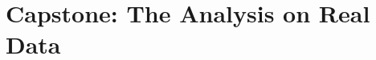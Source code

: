 \chapter{Capstone: The Analysis on Real Data}\label{ch:13}
\providecommand{\TwelveAHoleMaxFull}{}\renewcommand{\TwelveAHoleMaxFull}{7899}
\providecommand{\TwelveAKeptMaxFull}{}\renewcommand{\TwelveAKeptMaxFull}{501}
\providecommand{\TwelveAHoleMaxHmOne}{}\renewcommand{\TwelveAHoleMaxHmOne}{9952}
\providecommand{\TwelveAKeptMaxHmOne}{}\renewcommand{\TwelveAKeptMaxHmOne}{521}
\providecommand{\TwelveAHoleMaxHmTwo}{}\renewcommand{\TwelveAHoleMaxHmTwo}{5906}
\providecommand{\TwelveAKeptMaxHmTwo}{}\renewcommand{\TwelveAKeptMaxHmTwo}{513}
\providecommand{\TwelveABeamVsGauss}{}\renewcommand{\TwelveABeamVsGauss}{0.07}
\providecommand{\TwelveAFskyMaskFull}{}\renewcommand{\TwelveAFskyMaskFull}{0.779}
\providecommand{\TwelveAFskyMaskFive}{}\renewcommand{\TwelveAFskyMaskFive}{0.775}
\providecommand{\TwelveAFskyMaskTen}{}\renewcommand{\TwelveAFskyMaskTen}{0.778}
\providecommand{\TwelveAPrepSeconds}{}\renewcommand{\TwelveAPrepSeconds}{52}
\providecommand{\TwelveAHoles}{}\renewcommand{\TwelveAHoles}{3307}
\providecommand{\TwelveAHolesBig}{}\renewcommand{\TwelveAHolesBig}{3}
\providecommand{\TwelveAFskyGal}{}\renewcommand{\TwelveAFskyGal}{0.796}
\providecommand{\TwelveAFskyPS}{}\renewcommand{\TwelveAFskyPS}{0.021}
\providecommand{\TwelveAFskyBin}{}\renewcommand{\TwelveAFskyBin}{0.775}
\providecommand{\TwelveAWtwoBin}{}\renewcommand{\TwelveAWtwoBin}{1.000}
\providecommand{\TwelveAFskyEffBin}{}\renewcommand{\TwelveAFskyEffBin}{0.775}
\providecommand{\TwelveAFskyMain}{}\renewcommand{\TwelveAFskyMain}{0.775}
\providecommand{\TwelveAWtwoMain}{}\renewcommand{\TwelveAWtwoMain}{0.894}
\providecommand{\TwelveAFskyEffMain}{}\renewcommand{\TwelveAFskyEffMain}{0.708}
\providecommand{\TwelveAFskyCut}{}\renewcommand{\TwelveAFskyCut}{0.488}
\providecommand{\TwelveAWtwoCut}{}\renewcommand{\TwelveAWtwoCut}{0.914}
\providecommand{\TwelveAFskyEffCut}{}\renewcommand{\TwelveAFskyEffCut}{0.454}
\providecommand{\TwelveAFskyNorth}{}\renewcommand{\TwelveAFskyNorth}{0.387}
\providecommand{\TwelveAWtwoNorth}{}\renewcommand{\TwelveAWtwoNorth}{0.909}
\providecommand{\TwelveAFskyEffNorth}{}\renewcommand{\TwelveAFskyEffNorth}{0.359}
\providecommand{\TwelveAFskySouth}{}\renewcommand{\TwelveAFskySouth}{0.387}
\providecommand{\TwelveAWtwoSouth}{}\renewcommand{\TwelveAWtwoSouth}{0.879}
\providecommand{\TwelveAFskyEffSouth}{}\renewcommand{\TwelveAFskyEffSouth}{0.349}
\providecommand{\TwelveAMaskSeconds}{}\renewcommand{\TwelveAMaskSeconds}{7}
\providecommand{\TwelveAMono}{}\renewcommand{\TwelveAMono}{0.6}
